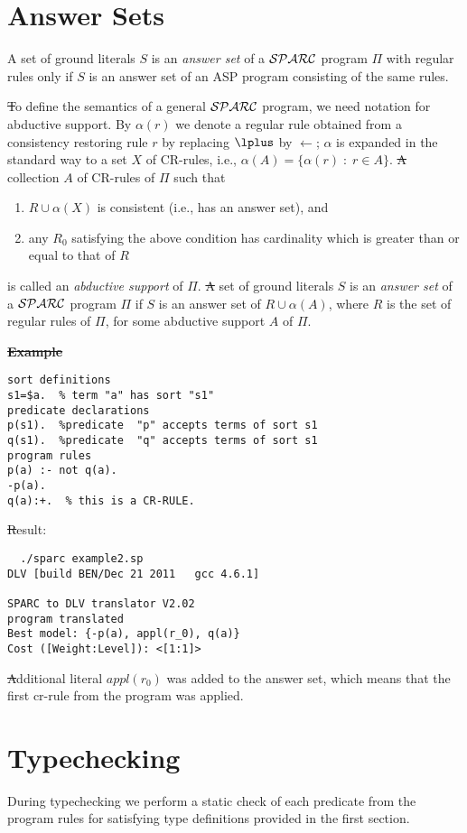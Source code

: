 \documentclass[12pt, letterpaper]{article}
\begin{document}
\section{Answer Sets}
\noindent A set of ground literals $S$ is an {\em answer set} of a ${\cal SPARC}$ 
program $\Pi$ with regular rules only if $S$ is an answer set of an ASP program consisting of the same rules.

\st To define the semantics of a general ${\cal SPARC}$ program, we need notation for abductive support.
By $\alpha(r)$ we denote a regular rule
obtained from a consistency restoring rule $r$
by replacing $\lplus$ by $\leftarrow$;
$\alpha$ is expanded in the standard way to a set $X$ of CR-rules,
i.e., $\alpha(A) = \{\alpha(r)\; :\; r \in A\}$.
\st A %
collection $A$ of CR-rules of $\Pi$ such that
\begin{enumerate}
\item $R \cup \alpha(X)$ is consistent (i.e., has an answer set), and
\item any $R_0$ satisfying the above condition has cardinality
which is greater than or equal to that of $R$
\end{enumerate}
is called an {\em abductive support} of $\Pi$.
\st A set of ground literals $S$ is an {\em answer set} of a ${\cal SPARC}$ program 
$\Pi$ if $S$ is an answer set of $R \cup \alpha(A)$, where $R$ is the set of regular rules of $\Pi$, for some abductive
support $A$ of $\Pi$.

\st \textbf{Example}
\begin{verbatim}
sort definitions
s1=$a.  % term "a" has sort "s1"
predicate declarations
p(s1).  %predicate  "p" accepts terms of sort s1 
q(s1).  %predicate  "q" accepts terms of sort s1 
program rules
p(a) :- not q(a).
-p(a).
q(a):+.  % this is a CR-RULE. 
\end{verbatim}
\st Result:
\begin{verbatim}
  ./sparc example2.sp
DLV [build BEN/Dec 21 2011   gcc 4.6.1]

SPARC to DLV translator V2.02
program translated
Best model: {-p(a), appl(r_0), q(a)}
Cost ([Weight:Level]): <[1:1]>

\end{verbatim}

\st Additional literal $appl(r_0)$ was added to the answer set, which means that the 
first cr-rule from the program was applied.
\section{Typechecking}
During typechecking  we perform a static check of each predicate from the program rules for 
satisfying type definitions provided in the first section.
\end{document}
